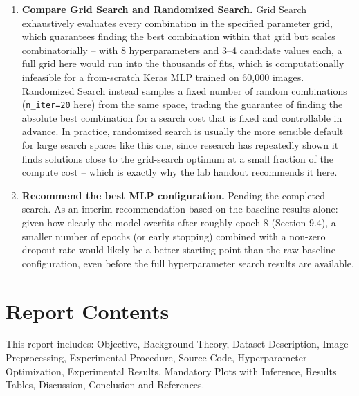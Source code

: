 \documentclass[11pt]{article}
\begin{document}
\begin{enumerate}[label=\arabic*.]
    \item \textbf{Compare Grid Search and Randomized Search.} Grid Search exhaustively evaluates every combination in the specified parameter grid, which guarantees finding the best combination within that grid but scales combinatorially -- with 8 hyperparameters and 3--4 candidate values each, a full grid here would run into the thousands of fits, which is computationally infeasible for a from-scratch Keras MLP trained on 60,000 images. Randomized Search instead samples a fixed number of random combinations (\texttt{n\_iter=20} here) from the same space, trading the guarantee of finding the absolute best combination for a search cost that is fixed and controllable in advance. In practice, randomized search is usually the more sensible default for large search spaces like this one, since research has repeatedly shown it finds solutions close to the grid-search optimum at a small fraction of the compute cost -- which is exactly why the lab handout recommends it here.

    \item \textbf{Recommend the best MLP configuration.} Pending the completed search. As an interim recommendation based on the baseline results alone: given how clearly the model overfits after roughly epoch 8 (Section 9.4), a smaller number of epochs (or early stopping) combined with a non-zero dropout rate would likely be a better starting point than the raw baseline configuration, even before the full hyperparameter search results are available.
\end{enumerate}

\section{Report Contents}
This report includes: Objective, Background Theory, Dataset Description, Image Preprocessing, Experimental Procedure, Source Code, Hyperparameter Optimization, Experimental Results, Mandatory Plots with Inference, Results Tables, Discussion, Conclusion and References.

\end{document}
